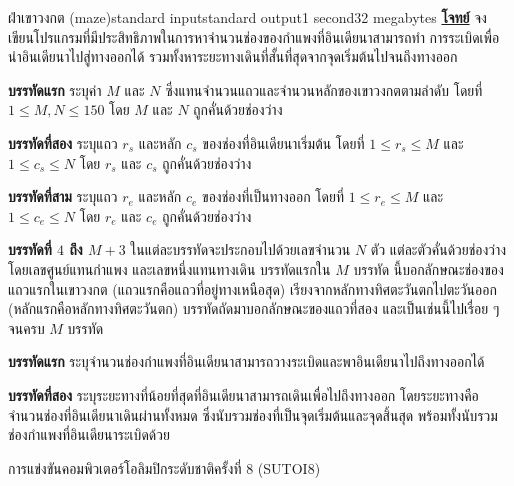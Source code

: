 \documentclass[11pt,a4paper]{article}
\begin{document}
\begin{problem}{ฝ่าเขาวงกต (maze)}{standard input}{standard output}{1 second}{32 megabytes}
\bigskip
\underline{\textbf{โจทย์}}   จงเขียนโปรแกรมที่มีประสิทธิภาพในการหาจำนวนช่องของกำแพงที่อินเดียนาสามารถทำ การระเบิดเพื่อนำอินเดียนาไปสู่ทางออกได้ รวมทั้งหาระยะทางเดินที่สั้นที่สุดจากจุดเริ่มต้นไปจนถึงทางออก


\InputFile

\textbf{บรรทัดแรก} ระบุค่า $M$ และ $N$ ซึ่งแทนจำนวนแถวและจำนวนหลักของเขาวงกตตามลำดับ โดยที่ $1 \leq M,N \leq 150$ โดย $M$ และ $N$ ถูกคั่นด้วยช่องว่าง

\textbf{บรรทัดที่สอง} ระบุแถว $r_s$ และหลัก $c_s$ ของช่องที่อินเดียนาเริ่มต้น โดยที่ $1 \leq r_s \leq M$ และ $1 \leq c_s \leq N$ โดย $r_s$ และ $c_s$ ถูกคั่นด้วยช่องว่าง

\textbf{บรรทัดที่สาม} ระบุแถว $r_e$ และหลัก $c_e$ ของช่องที่เป็นทางออก โดยที่ $1 \leq  r_e \leq M$ และ $1 \leq c_e \leq N$ โดย  $r_e$ และ $c_e$ ถูกคั่นด้วยช่องว่าง

\textbf{บรรทัดที่ $4$ ถึง $M+3$} ในแต่ละบรรทัดจะประกอบไปด้วยเลขจำนวน $N$ ตัว แต่ละตัวคั่นด้วยช่องว่าง โดยเลขศูนย์แทนกำแพง และเลขหนึ่งแทนทางเดิน บรรทัดแรกใน $M$ บรรทัด นี้บอกลักษณะช่องของแถวแรกในเขาวงกต (แถวแรกคือแถวที่อยู่ทางเหนือสุด) เรียงจากหลักทางทิศตะวันตกไปตะวันออก (หลักแรกคือหลักทางทิศตะวันตก) บรรทัดถัดมาบอกลักษณะของแถวที่สอง และเป็นเช่นนี้ไปเรื่อย ๆ จนครบ $M$ บรรทัด


\OutputFile

\textbf{บรรทัดแรก} ระบุจำนวนช่องกำแพงที่อินเดียนาสามารถวางระเบิดและพาอินเดียนาไปถึงทางออกได้

\textbf{บรรทัดที่สอง} ระบุระยะทางที่น้อยที่สุดที่อินเดียนาสามารถเดินเพื่อไปถึงทางออก โดยระยะทางคือจำนวนช่องที่อินเดียนาเดินผ่านทั้งหมด ซึ่งนับรวมช่องที่เป็นจุดเริ่มต้นและจุดสิ้นสุด พร้อมทั้งนับรวมช่องกำแพงที่อินเดียนาระเบิดด้วย

\Examples

\begin{example}
%
\end{example}

\begin{example}
%
\end{example}


\Source

การแข่งขันคอมพิวเตอร์โอลิมปิกระดับชาติครั้งที่ 8 (SUTOI8)


\end{problem}
\end{document}
